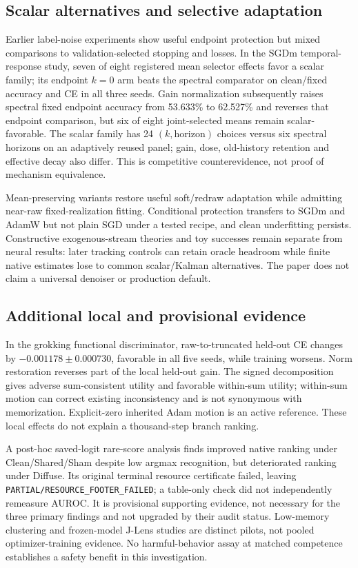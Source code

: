 \documentclass[10pt]{article}
\begin{document}
\subsection{Scalar alternatives and selective adaptation}
Earlier label-noise experiments show useful endpoint protection but mixed comparisons to validation-selected stopping and losses. In the SGDm temporal-response study, seven of eight registered mean selector effects favor a scalar family; its endpoint $k=0$ arm beats the spectral comparator on clean/fixed accuracy and CE in all three seeds. Gain normalization subsequently raises spectral fixed endpoint accuracy from 53.633\% to 62.527\% and reverses that endpoint comparison, but six of eight joint-selected means remain scalar-favorable. The scalar family has 24 $(k,\mathrm{horizon})$ choices versus six spectral horizons on an adaptively reused panel; gain, dose, old-history retention and effective decay also differ. This is competitive counterevidence, not proof of mechanism equivalence.

Mean-preserving variants restore useful soft/redraw adaptation while admitting near-raw fixed-realization fitting. Conditional protection transfers to SGDm and AdamW but not plain SGD under a tested recipe, and clean underfitting persists. Constructive exogenous-stream theories and toy successes remain separate from neural results: later tracking controls can retain oracle headroom while finite native estimates lose to common scalar/Kalman alternatives. The paper does not claim a universal denoiser or production default.

\subsection{Additional local and provisional evidence}
In the grokking functional discriminator, raw-to-truncated held-out CE changes by $-0.001178\pm0.000730$, favorable in all five seeds, while training worsens. Norm restoration reverses part of the local held-out gain. The signed decomposition gives adverse sum-consistent utility and favorable within-sum utility; within-sum motion can correct existing inconsistency and is not synonymous with memorization. Explicit-zero inherited Adam motion is an active reference. These local effects do not explain a thousand-step branch ranking.

A post-hoc saved-logit rare-score analysis finds improved native ranking under Clean/Shared/Sham despite low argmax recognition, but deteriorated ranking under Diffuse. Its original terminal resource certificate failed, leaving \texttt{PARTIAL/RESOURCE\_FOOTER\_FAILED}; a table-only check did not independently remeasure AUROC. It is provisional supporting evidence, not necessary for the three primary findings and not upgraded by their audit status. Low-memory clustering and frozen-model J-Lens studies are distinct pilots, not pooled optimizer-training evidence. No harmful-behavior assay at matched competence establishes a safety benefit in this investigation.
\end{document}
